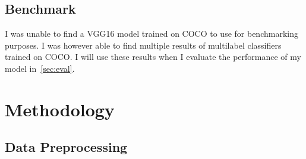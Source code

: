 \documentclass[12pt,journal,compsoc]{IEEEtran}
\begin{document}
\subsection{Benchmark}



I was unable to find a VGG16 model trained on COCO to use for benchmarking purposes.  I was however able to find multiple results of multilabel classifiers trained on COCO.  I will use these results when I evaluate the performance of my model in~\ref{sec:eval}.

\section{Methodology}\label{sec:method} %
\subsection{Data Preprocessing}



\end{document}

